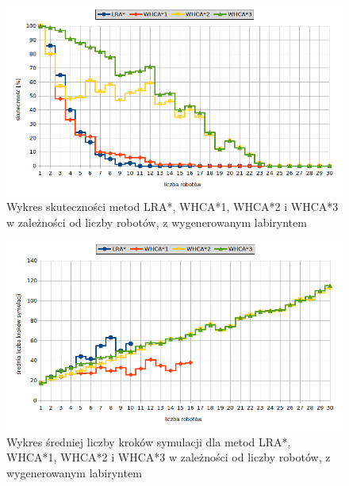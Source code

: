 
\begin{figure}
	\centering
	\includegraphics[width=0.8\columnwidth]{img/plots/test-steps-maze-robots-eff}
	\caption{Wykres skuteczności metod LRA*, WHCA*1, WHCA*2 i WHCA*3 w zależności od liczby robotów, z wygenerowanym labiryntem}
	\label{fig:test-steps-maze-robots-eff}
\end{figure}
\begin{figure}
	\centering
	\includegraphics[width=0.8\columnwidth]{img/plots/test-steps-maze-robots-steps}
	\caption{Wykres średniej liczby kroków symulacji dla metod LRA*, WHCA*1, WHCA*2 i WHCA*3 w zależności od liczby robotów, z wygenerowanym labiryntem}
	\label{fig:test-steps-maze-robots-steps}
\end{figure}
